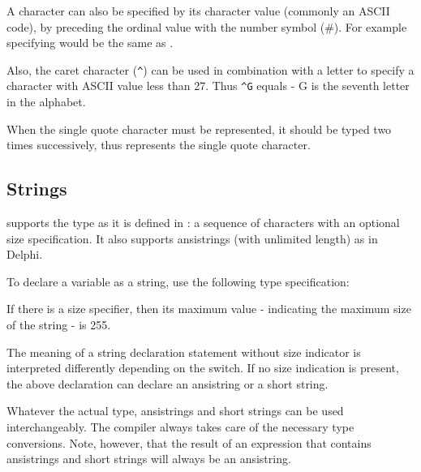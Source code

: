 A character can also be specified by its character
value (commonly an ASCII code), by preceding the ordinal value with the 
number symbol (\#). For example specifying  would be the same as .

Also, the caret character (\verb+^+) can be used in combination with a letter to
specify a character with ASCII value less than 27. Thus \verb+^G+ equals
 - G is the seventh letter in the alphabet.

When the single quote character must be represented, it should be typed
two times successively, thus  represents the single quote character.

\subsection{Strings}
\fpc supports the  type as it is defined in \tp:
a sequence of characters with an optional size specification.
It also supports ansistrings (with unlimited length) as in Delphi.

To declare a variable as a string, use the following type specification:

If there is a size specifier, then its maximum value - indicating the maximum 
size of the string - is 255.

The meaning of a string declaration statement without size indicator is 
interpreted differently depending on the  switch. If no size
indication is present, the above declaration can declare an ansistring or 
a short string.

Whatever the actual type, ansistrings and short strings can be used
interchangeably. The compiler always takes care of the necessary type
conversions. Note, however, that the result of an expression that contains
ansistrings and short strings will always be an ansistring.

